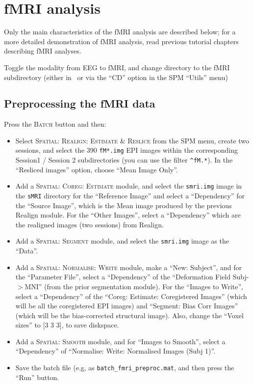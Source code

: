 \section{fMRI analysis \label{multimodal:data:fMRI}}

Only the main characteristics of the fMRI analysis are described below; for a more detailed demonstration of fMRI analysis, read previous tutorial chapters describing fMRI analyses.

Toggle the modality from EEG to fMRI, and change directory to the fMRI subdirectory (either in \matlab\, or via the ``CD'' option in the SPM ``Utils'' menu)

\subsection{Preprocessing the fMRI data}

Press the \textsc{Batch} button and then:

\begin{itemize}
\item Select \textsc{Spatial: Realign: Estimate \& Reslice} from the SPM menu, create two sessions, and select the 390 \texttt{fM*.img} EPI images within the corresponding Session1 / Session 2 subdirectories (you can use the filter  \texttt{\textasciicircum fM.*}). In the ``Resliced images'' option, choose ``Mean Image Only''.

\item Add a \textsc{Spatial: Coreg: Estimate} module, and select the \texttt{smri.img} image in the \texttt{sMRI} directory for the ``Reference Image'' and select a ``Dependency'' for the ``Source Image'', which is the Mean image produced by the previous Realign module. For the ``Other Images'', select a ``Dependency'' which are the realigned images (two sessions) from Realign.

\item Add a \textsc{Spatial: Segment} module, and select the \texttt{smri.img} image as the ``Data''.

\item Add a \textsc{Spatial: Normalise: Write} module, make a ``New: Subject'', and for the ``Parameter File'', select a ``Dependency'' of the ``Deformation Field Subj-$>$MNI'' (from the prior segmentation module). For the ``Images to Write'', select a ``Dependency'' of the ``Coreg: Estimate: Coregistered Images'' (which will be all the coregistered EPI images) and ``Segment: Bias Corr Images'' (which will be the bias-corrected structural image). Also, change the ``Voxel sizes'' to [3 3 3], to save diskspace.

\item Add a \textsc{Spatial: Smooth} module, and for ``Images to Smooth'', select a ``Dependency'' of ``Normalise: Write: Normalised Images (Subj 1)''.

\item Save the batch file (e.g, as \texttt{batch\_fmri\_preproc.mat}, and then press the ``Run'' button.
\end{itemize}

